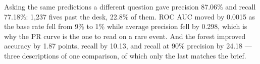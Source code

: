 \documentclass[11pt,a4paper]{article}
\begin{document}
Asking the same predictions a different question gave precision 87.06\% and
recall 77.18\%: 1{,}237 fives past the desk, 22.8\% of them. ROC AUC moved by
0.0015 as the base rate fell from 9\% to 1\% while average precision fell by
0.298, which is why the PR curve is the one to read on a rare event. And the
forest improved accuracy by 1.87 points, recall by 10.13, and recall at 90\%
precision by 24.18 --- three descriptions of one comparison, of which only the
last matches the brief.
\end{document}
